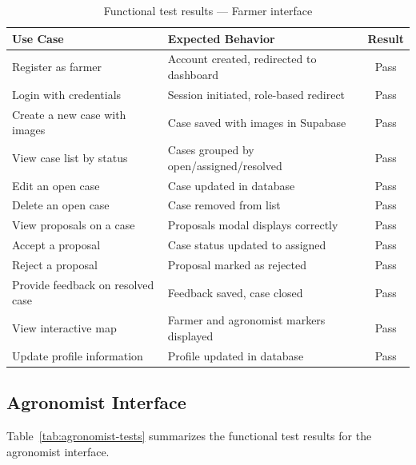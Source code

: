 \begin{table}[H]
\centering
\caption{Functional test results — Farmer interface}
\label{tab:farmer-tests}
\begin{tabular}{p{6cm} p{5.5cm} c}
\toprule
\textbf{Use Case} & \textbf{Expected Behavior} & \textbf{Result} \\
\midrule
Register as farmer & Account created, redirected to dashboard & Pass \\
Login with credentials & Session initiated, role-based redirect & Pass \\
Create a new case with images & Case saved with images in Supabase & Pass \\
View case list by status & Cases grouped by open/assigned/resolved & Pass \\
Edit an open case & Case updated in database & Pass \\
Delete an open case & Case removed from list & Pass \\
View proposals on a case & Proposals modal displays correctly & Pass \\
Accept a proposal & Case status updated to assigned & Pass \\
Reject a proposal & Proposal marked as rejected & Pass \\
Provide feedback on resolved case & Feedback saved, case closed & Pass \\
View interactive map & Farmer and agronomist markers displayed & Pass \\
Update profile information & Profile updated in database & Pass \\
\bottomrule
\end{tabular}
\end{table}

\subsection{Agronomist Interface}

Table~\ref{tab:agronomist-tests} summarizes the functional test results for the agronomist interface.

